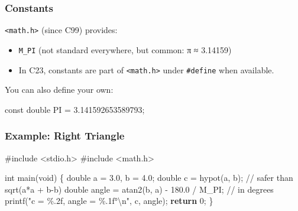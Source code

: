 \documentclass[
  letterpaper,
  DIV=11,
  numbers=noendperiod]{scrreprt}
\newenvironment{Shaded}{\begin{snugshade}}{\end{snugshade}}
\newcommand{\CommentTok}[1]{\textcolor[rgb]{0.37,0.37,0.37}{#1}}
\newcommand{\ControlFlowTok}[1]{\textcolor[rgb]{0.00,0.23,0.31}{\textbf{#1}}}
\newcommand{\DataTypeTok}[1]{\textcolor[rgb]{0.68,0.00,0.00}{#1}}
\newcommand{\DecValTok}[1]{\textcolor[rgb]{0.68,0.00,0.00}{#1}}
\newcommand{\FloatTok}[1]{\textcolor[rgb]{0.68,0.00,0.00}{#1}}
\newcommand{\ImportTok}[1]{\textcolor[rgb]{0.00,0.46,0.62}{#1}}
\newcommand{\NormalTok}[1]{\textcolor[rgb]{0.00,0.23,0.31}{#1}}
\newcommand{\OperatorTok}[1]{\textcolor[rgb]{0.37,0.37,0.37}{#1}}
\newcommand{\PreprocessorTok}[1]{\textcolor[rgb]{0.68,0.00,0.00}{#1}}
\newcommand{\SpecialCharTok}[1]{\textcolor[rgb]{0.37,0.37,0.37}{#1}}
\newcommand{\StringTok}[1]{\textcolor[rgb]{0.13,0.47,0.30}{#1}}
\providecommand{\tightlist}{%
  \setlength{\itemsep}{0pt}\setlength{\parskip}{0pt}}
\begin{document}
\subsubsection{Constants}\label{constants}

\texttt{\textless{}math.h\textgreater{}} (since C99) provides:

\begin{itemize}
\tightlist
\item
  \texttt{M\_PI} (not standard everywhere, but common: π ≈ 3.14159)
\item
  In C23, constants are part of \texttt{\textless{}math.h\textgreater{}}
  under \texttt{\#define} when available.
\end{itemize}

You can also define your own:

\begin{Shaded}
\begin{Highlighting}[]
\DataTypeTok{const} \DataTypeTok{double}\NormalTok{ PI }\OperatorTok{=} \FloatTok{3.141592653589793}\OperatorTok{;}
\end{Highlighting}
\end{Shaded}

\subsubsection{Example: Right Triangle}\label{example-right-triangle}

\begin{Shaded}
\begin{Highlighting}[]
\PreprocessorTok{\#include }\ImportTok{\textless{}stdio.h\textgreater{}}
\PreprocessorTok{\#include }\ImportTok{\textless{}math.h\textgreater{}}

\DataTypeTok{int}\NormalTok{ main}\OperatorTok{(}\DataTypeTok{void}\OperatorTok{)} \OperatorTok{\{}
    \DataTypeTok{double}\NormalTok{ a }\OperatorTok{=} \FloatTok{3.0}\OperatorTok{,}\NormalTok{ b }\OperatorTok{=} \FloatTok{4.0}\OperatorTok{;}
    \DataTypeTok{double}\NormalTok{ c }\OperatorTok{=}\NormalTok{ hypot}\OperatorTok{(}\NormalTok{a}\OperatorTok{,}\NormalTok{ b}\OperatorTok{);}   \CommentTok{// safer than sqrt(a*a + b{-}b)}
    \DataTypeTok{double}\NormalTok{ angle }\OperatorTok{=}\NormalTok{ atan2}\OperatorTok{(}\NormalTok{b}\OperatorTok{,}\NormalTok{ a}\OperatorTok{)} \OperatorTok{{-}} \FloatTok{180.0} \OperatorTok{/}\NormalTok{ M\_PI}\OperatorTok{;} \CommentTok{// in degrees}
\NormalTok{    printf}\OperatorTok{(}\StringTok{"c = }\SpecialCharTok{\%.2f}\StringTok{, angle = }\SpecialCharTok{\%.1f}\StringTok{°}\SpecialCharTok{\textbackslash{}n}\StringTok{"}\OperatorTok{,}\NormalTok{ c}\OperatorTok{,}\NormalTok{ angle}\OperatorTok{);}
    \ControlFlowTok{return} \DecValTok{0}\OperatorTok{;}
\OperatorTok{\}}
\end{Highlighting}
\end{Shaded}
\end{document}
